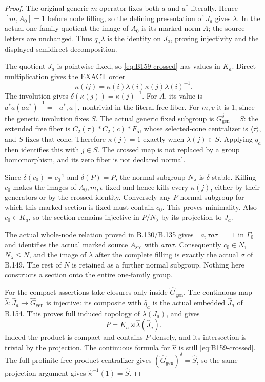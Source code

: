 \begin{proof}
The original generic $m$ operator fixes both $a$ and $a^*$ literally.
Hence $[m,A_0]=1$ before node filling, so the defining presentation
of $J_a$ gives $\lambda$. In the actual one-family quotient the
image of $A_0$ is its marked norm $A$; the source letters are unchanged.
Thus $q_a\lambda$ is the identity on $J_a$, proving injectivity and
the displayed semidirect decomposition.

The quotient $J_a$ is pointwise fixed, so \eqref{eq:B159-crossed}
has values in $K_a$. Direct multiplication gives the EXACT order
\[
 \kappa(ij)=\kappa(i)\lambda(i)\kappa(j)\lambda(i)^{-1}.
\]
The involution gives $\delta(\kappa(j))=\kappa(j)^{-1}$.
For $A$, its value is
$a^*a(a a^*)^{-1}=[a^*,a]$, nontrivial in the literal free fiber.
For $m,v$ it is $1$, since the generic involution fixes $S$.
The actual generic fixed subgroup is $G_{\mathrm{gen}}^\delta=S$:
the extended free fiber is
$C_2(\tau)*C_2(c)*F_5$, whose selected-cone centralizer is
$\langle\tau\rangle$, and $S$ fixes that cone. Therefore
$\kappa(j)=1$ exactly when $\lambda(j)\in S$. Applying $q_a$
then identifies this with $j\in S$. The crossed map is not replaced
by a group homomorphism, and its zero fiber is not declared normal.

Since $\delta(c_0)=c_0^{-1}$ and $\delta(P)=P$, the normal subgroup
$N_\lambda$ is $\delta$-stable. Killing $c_0$ makes the images of
$A_0,m,v$ fixed and hence kills every $\kappa(j)$, either by their
generators or by the crossed identity. Conversely any $P$-normal
subgroup for which this marked section is fixed must contain $c_0$.
This proves minimality. Also $c_0\in K_a$, so the section remains
injective in $P/N_\lambda$ by its projection to $J_a$.

The actual whole-node relation proved in B.130/B.135 gives
$[a,\tau a\tau]=1$ in $\Gamma_0$ and identifies the actual marked
source $A_{\mathrm{src}}$ with $a\tau a\tau$. Consequently
$c_0\in N$, $N_\lambda\le N$, and the image of $\lambda$ after
the complete filling is exactly the actual $\sigma$ of B.149.
The rest of $N$ is retained as a further normal subgroup. Nothing
here constructs a section onto the entire one-family group.

For the compact assertions take closures only inside
$\widehat G_{\mathrm{gen}}$. The continuous map
$\widehat\lambda:\widehat J_a\to\widehat G_{\mathrm{gen}}$ is
injective: its composite with $\widehat q_a$ is the actual embedded
$\widehat J_a$ of B.154. This proves full induced topology of
$\lambda(J_a)$, and gives
\[
 \overline P=\overline{K_a}\rtimes\widehat\lambda(\widehat J_a).
\]
Indeed the product is compact and contains $P$ densely, and its
intersection is trivial by the projection. The continuous formula
for $\widehat\kappa$ is still \eqref{eq:B159-crossed}.
The full profinite free-product centralizer gives
$(\widehat G_{\mathrm{gen}})^\delta=\widehat S$, so the same
projection argument gives $\widehat\kappa^{-1}(1)=\widehat S$.


\end{proof}
